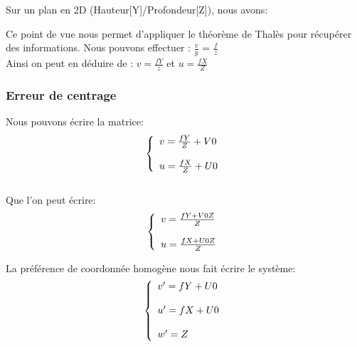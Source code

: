 \documentclass[12pt, french]{report}
\begin{document}
Sur un plan en 2D (Hauteur[Y]/Profondeur[Z]), nous avons:\\

\begin{center}
\end{center}
Ce point de vue nous permet d'appliquer le théorème de Thalès pour récupérer des informations. Nous pouvons effectuer : $\frac{v}{y}$ = $\frac{f}{z}$ \\

Ainsi on peut en déduire de : $v=\frac{fY}{z}$ et $u=\frac{fX}{Z}$

\subsubsection{Erreur de centrage}

Nous pouvons écrire la matrice: 
$$\left\{ 
    \begin{array}{ll}
        v=\frac{fY}{Z}+V0  \\ \\
        u=\frac{fX}{Z}+U0
    \end{array} \\
\right. $$ \\

Que l'on peut écrire: 
$$\left\{ 
    \begin{array}{ll}
        v=\frac{fY+V0Z}{Z} \\ \\
        u=\frac{fX+U0Z}{Z}
    \end{array} \\
\right. $$

La préférence de coordonnée homogène nous fait écrire le système:
$$\left\{ 
    \begin{array}{ll}
        v'=fY+U0\\ \\
        u'=fX+U0 \\ \\
        w'=Z
    \end{array} \\
\right. $$
\end{document}
